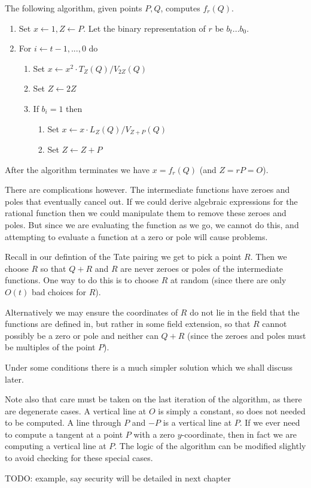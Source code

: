 The following algorithm, given points $P, Q$, computes
$f_r(Q)$.

\begin{enumerate}
\item
Set $x \leftarrow 1, Z \leftarrow P$.
Let the binary representation of $r$ be $b_t ... b_0$.
\item
For $i \leftarrow t-1, ..., 0$ do
    \begin{enumerate}
    \item
    Set $x \leftarrow x^2 \cdot T_Z(Q) / V_{2Z}(Q)$
    \item
    Set $Z \leftarrow 2Z$
    \item
    If $b_i = 1$ then
	\begin{enumerate}
	\item
	Set $x \leftarrow x \cdot L_{Z}(Q) / V_{Z+P}(Q)$
	\item
	Set $Z \leftarrow Z + P$
	\end{enumerate}
    \end{enumerate}
\end{enumerate}

After the algorithm terminates we have $x = f_r(Q)$ (and $Z = rP = O$).

There are complications however. The intermediate functions have zeroes
and poles that eventually cancel out. If we could derive algebraic expressions
for the rational function then we could manipulate them to remove these
zeroes and poles. But since we are evaluating the function as we go,
we cannot do this, and attempting to evaluate a function at a zero
or pole will cause problems.

Recall in our defintion of the Tate pairing we get to pick a point $R$.
Then we choose $R$ so that $Q+R$ and $R$ are never zeroes or poles
of the intermediate functions. One way to do this is to choose
$R$ at random (since there are only $O(t)$ bad choices for $R$).

Alternatively we may ensure the coordinates of $R$ do not lie in the
field that the functions are defined in, but rather in some field
extension, so that
$R$ cannot possibly be a zero or pole and neither can $Q + R$ (since the
zeroes and poles must be multiples of the point $P$).

Under some conditions there is a much simpler solution which we shall
discuss later.

Note also that care must be taken on the last iteration of the algorithm,
as there are degenerate cases. A vertical line at $O$ is simply a constant,
so does not needed to be computed. A line through $P$ and $-P$ is a vertical
line at $P$. If we ever need to compute a tangent at a point $P$ with a zero
$y$-coordinate, then in fact we are computing a vertical line at $P$.
The logic of the algorithm can be modified slightly to avoid checking
for these special cases.

TODO: example, say security will be detailed in next chapter

